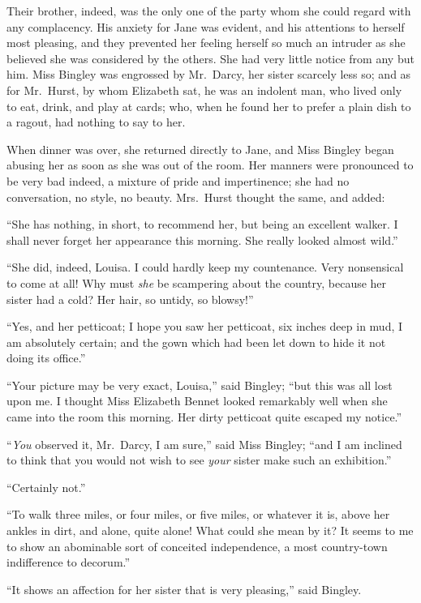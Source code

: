 \documentclass[12pt,english,oneside]{book}
\begin{document}
Their brother, indeed, was the only one of the party whom she could
regard with any complacency. His anxiety for Jane was evident, and
his attentions to herself most pleasing, and they prevented her feeling
herself so much an intruder as she believed she was considered by
the others. She had very little notice from any but him. Miss Bingley
was engrossed by Mr.\ Darcy, her sister scarcely less so; and as
for Mr.\ Hurst, by whom Elizabeth sat, he was an indolent man, who
lived only to eat, drink, and play at cards; who, when he found her
to prefer a plain dish to a ragout, had nothing to say to her.

When dinner was over, she returned directly to Jane, and Miss Bingley
began abusing her as soon as she was out of the room. Her manners
were pronounced to be very bad indeed, a mixture of pride and impertinence;
she had no conversation, no style, no beauty. Mrs.\ Hurst thought
the same, and added:

{}``She has nothing, in short, to recommend her, but being an excellent
walker. I shall never forget her appearance this morning. She really
looked almost wild.''

{}``She did, indeed, Louisa. I could hardly keep my countenance.
Very nonsensical to come at all! Why must \textit{she} be scampering
about the country, because her sister had a cold? Her hair, so untidy,
so blowsy!''\ 

{}``Yes, and her petticoat; I hope you saw her petticoat, six inches
deep in mud, I am absolutely certain; and the gown which had been
let down to hide it not doing its office.''

{}``Your picture may be very exact, Louisa,'' said Bingley; {}``but
this was all lost upon me. I thought Miss Elizabeth Bennet looked
remarkably well when she came into the room this morning. Her dirty
petticoat quite escaped my notice.''

{}``\textit{You} observed it, Mr.\ Darcy, I am sure,'' said Miss
Bingley; {}``and I am inclined to think that you would not wish to
see \textit{your} sister make such an exhibition.''

{}``Certainly not.''

{}``To walk three miles, or four miles, or five miles, or whatever
it is, above her ankles in dirt, and alone, quite alone! What could
she mean by it? It seems to me to show an abominable sort of conceited
independence, a most country-town indifference to decorum.''

{}``It shows an affection for her sister that is very pleasing,''
said Bingley.
\end{document}
